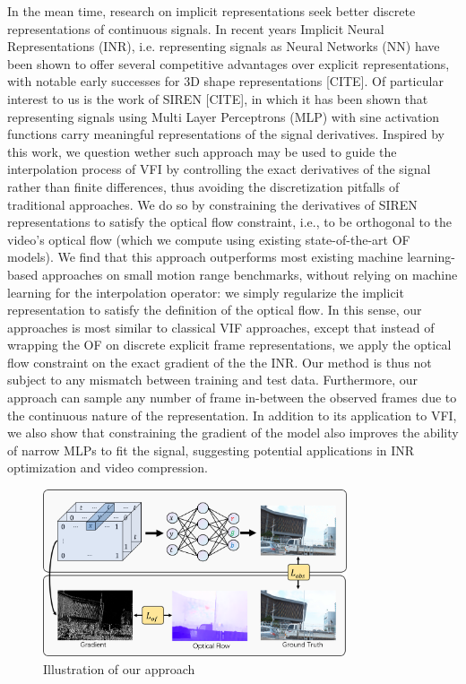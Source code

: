 \documentclass{article}
\begin{document}
In the mean time, research on implicit representations seek better discrete representations of continuous signals.
In recent years Implicit Neural Representations (INR), i.e. representing signals as Neural Networks (NN)
have been shown to offer several competitive advantages over explicit representations,
with notable early successes for 3D shape representations [CITE].
Of particular interest to us is the work of SIREN [CITE],
in which it has been shown that representing
signals using Multi Layer Perceptrons (MLP) with sine activation functions
carry meaningful representations of the signal derivatives.
Inspired by this work, we question wether such approach may be used to guide the interpolation
process of VFI by controlling the exact derivatives of the signal rather than finite differences,
thus avoiding the discretization pitfalls of traditional approaches.
We do so by constraining the derivatives of SIREN representations to satisfy the optical flow constraint,
i.e., to be orthogonal to the video's optical flow
(which we compute using existing state-of-the-art OF models).
We find that this approach outperforms most existing
machine learning-based approaches on small motion range benchmarks,
without relying on machine learning for the interpolation operator:
we simply regularize the implicit representation to satisfy the definition of the optical flow.
In this sense, our approaches is most similar to classical VIF approaches,
except that instead of wrapping the OF on discrete explicit frame representations,
we apply the optical flow constraint on the exact gradient of the the INR.
Our method is thus not subject to any mismatch between training and test data.
Furthermore, our approach can sample any number of frame in-between the observed frames
due to the continuous nature of the representation.
In addition to its application to VFI, we also show that constraining the gradient
of the model also improves the ability of narrow MLPs to fit the signal,
suggesting potential applications in INR optimization and video compression.

\begin{figure}[h]
\centering
\includegraphics[width=0.8\textwidth]{Method}
\caption{Illustration of our approach}
\end{figure}
\end{document}
